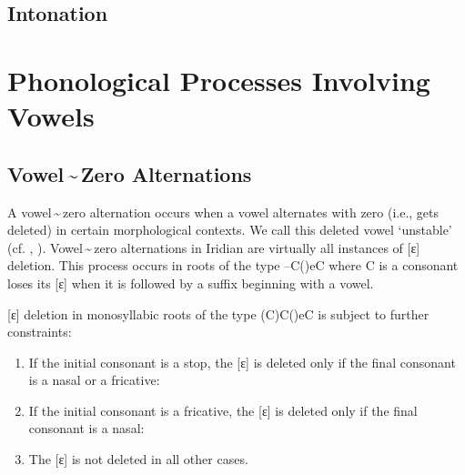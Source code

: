 \subsection{Intonation}

\section{Phonological Processes Involving Vowels}

\subsection{Vowel\,\sim\,Zero Alternations}

A vowel\,\sim\,zero alternation occurs when a vowel alternates with zero (i.e., gets deleted) in certain morphological contexts. We call this deleted vowel `unstable' (cf. \cite{siptar2000}, \cite{gussmann2007}). Vowel\,\sim\,zero alternations in Iridian are virtually all instances of [ɛ] deletion. This process occurs in roots of the type --C()eC where C is a consonant loses its [ɛ] when it is followed by a suffix beginning with a vowel.

\ex
{}
\xe

[ɛ] deletion in monosyllabic roots of the type (C)C()eC is subject to further constraints:

\begin{enumerate}
	\item If the initial consonant is a stop, the [ɛ] is deleted only if the final consonant is a nasal or a fricative:\\

	\item If the initial consonant is a fricative, the [ɛ] is deleted only if the final consonant is a nasal:\\

	\item The [ɛ] is not deleted in all other cases.
	 
\end{enumerate}

